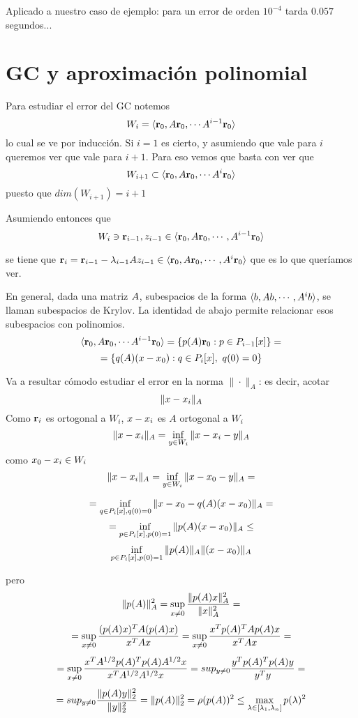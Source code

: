 Aplicado a nuestro caso de ejemplo: para un error de orden $10^{-4}$ tarda $0.057$ segundos...
\section{GC y aproximación polinomial}
Para estudiar el error del GC notemos
$$
W_i=\langle \rb_0, \Ab\rb_0, \cdots \Ab^{i-1}\rb_0\rangle
$$
lo cual se ve por inducción. Si $i=1$ es cierto, y asumiendo que vale para $i$ queremos ver que vale para $i+1$. Para eso vemos que basta con ver que 
$$
W_{i+1}\subset
\langle \rb_0, \Ab\rb_0, \cdots \Ab^{i}\rb_0\rangle
$$
puesto que $dim(W_{i+1})=i+1$

Asumiendo entonces que   
$$W_{i}\ni \rb_{i-1},\zb_{i-1}\in \langle \rb_0, \Ab\rb_0, \cdots ,\Ab^{i-1}\rb_0\rangle$$



se tiene que  $\rb_{i}=\rb_{i-1}-\lambda_{i-1}\Ab\zb_{i-1}\in \langle \rb_0, \Ab\rb_0, \cdots ,\Ab^{i}\rb_0\rangle$
que es lo que queríamos ver.

En general, dada una matriz $\Ab$, subespacios de la forma
$\langle \bb, \Ab\bb, \cdots ,\Ab^{i}\bb\rangle$, se llaman subespacios
de Krylov. La identidad de abajo permite relacionar esos subespacios con polinomios.
$$\langle \rb_0, \Ab\rb_0, \cdots \Ab^{i-1}\rb_0\rangle=\{ p(\Ab)\rb_0: p\in P_{i-1}[x]\}=$$
$$=\{ q(\Ab)(\xb-\xb_0): q\in P_{i}[x],\ q(0)=0\}$$

Va a resultar cómodo estudiar el error en la norma $\|\cdot\|_A$: es decir,  acotar 
$$
\|\xb-\xb_i\|_{A}$$
Como $\mathbf{r}_i$ es ortogonal a $W_i$, $\xb-\xb_i
$ es $A$ ortogonal a $W_i$
$$
\|\xb-\xb_i\|_{A}=\inf_{\yb\in W_i}\|\xb-\xb_i-\yb\|_{A}
$$
como $\xb_0-\xb_i\in W_i$
$$
\|\xb-\xb_i\|_{A}=\inf_{\yb\in W_i}
\|\xb-\xb_0-\yb\|_{A}
=$$

$$
=\inf_{q\in P_{i}[x],q(0)=0}\|\xb-\xb_0-q(\Ab)(\xb-\xb_0)\|_{A}
=$$
$$
=\inf_{p\in P_i[x],p(0)=1}\|p(\Ab)(\xb-\xb_0)\|_{A}
\le$$
$$
\inf_{p\in P_i[x],p(0)=1}\|p(\Ab)\|_{A}\|(\xb-\xb_0)\|_{A}
$$

pero
$$
\|p(\Ab)\|_A^2=\sup_{\xb\neq\cero}\frac{\|p(\Ab)\xb\|_A^2}{\|\xb\|_A^2}=
$$
$$=\sup_{\xb\neq\cero}\frac{(p(\Ab)\xb)^T\Ab (p(\Ab)\xb)}{\xb^T\Ab\xb}=\sup_{\xb\neq\cero}\frac{\xb^T p(\Ab)^T\Ab p(\Ab)\xb}{\xb^T\Ab\xb}=
$$
$$
=\sup_{\xb\neq\cero}\frac{\xb^T\Ab^{1/2} p(\Ab)^T p(\Ab)\Ab^{1/2}\xb}{\xb^T\Ab^{1/2}\Ab^{1/2}\xb}=sup_{\yb\neq\cero}\frac{\yb^T p(\Ab)^T p(\Ab)\yb}{\yb^T\yb}
=$$
$$
=sup_{\yb\neq\cero}\frac{ \|p(\Ab)\yb\|_2^2}{\|\yb\|^2_2}
=\|p(\Ab)\|_2^2=\rho(p(\Ab))^2\le \max_{\lambda\in [\lambda_1,\lambda_n]}p(\lambda)^2$$

